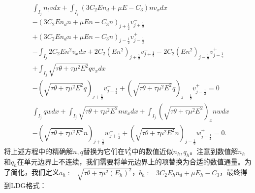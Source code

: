 \begin{align}
	 & \int_{I_{j}} n_{t} v d x+\int_{I_{j}}\left(3 C_{2} E n_{d}+\mu E-C_{3}\right) n v_{x} d x                                                                          \nonumber                                              \\
	 & -\left(3 C_{2} E n_{d} n+\mu E n-C_{3} n\right)_{j+\frac{1}{2}} v_{j+\frac{1}{2}}^{-}                                                                                       \nonumber                                     \\
	 & +\left(3 C_{2} E n_{d} n+\mu E n-C_{3} n\right)_{j-\frac{1}{2}} v_{j-\frac{1}{2}}^{+}                                                                                      \nonumber                                      \\
	 & -\int_{I_{j}} 2 C_{2} E n^{2} v_{x} d x+2 C_{2}\left(E n^{2}\right)_{j+\frac{1}{2}} v_{j+\frac{1}{2}}^{-}-2 C_{2}\left(E n^{2}\right)_{j-\frac{1}{2}} v_{j-\frac{1}{2}}^{+}           \nonumber                           \\
	 & +\int_{I_{j}} \sqrt{\tau \theta+\tau \mu^{2} E^{2}} q v_{x} d x                                                                                               \nonumber                                                   \\
	 & -\left(\sqrt{\tau \theta+\tau \mu^{2} E^{2}} q\right)_{j+\frac{1}{2}} v_{j+\frac{1}{2}}^{-}+\left(\sqrt{\tau \theta+\tau \mu^{2} E^{2}} q\right)_{j-\frac{1}{2}} v_{j-\frac{1}{2}}^{+}=0  \label{eq:HFRewrittenWeakForma} \\
	 & \int_{I_{j}} q w d x+\int_{I_{j}} \sqrt{\tau \theta+\tau \mu^{2} E^{2}} n w_{x} d x+\int_{I_{j}}\left(\sqrt{\tau \theta+\tau \mu^{2} E^{2}}\right)_{x} n w d x    \nonumber                                               \\
	 & -\left(\sqrt{\tau \theta+\tau \mu^{2} E^{2}} n\right)_{j+\frac{1}{2}} w_{j+\frac{1}{2}}^{-}+\left(\sqrt{\tau \theta+\tau \mu^{2} E^{2}} n\right)_{j-\frac{1}{2}} w_{j-\frac{1}{2}}^{+}=0 .\label{eq:HFRewrittenWeakFormb}
\end{align}
将上述方程中的精确解$n, q$替换为它们在$V_{h}^{k}$中的数值近似$n_h, q_h$。注意到数值解$n_h$和$q_h$在单元边界上不连续，我们需要将单元边界上的项替换为合适的数值通量。为了简化，我们定义$a_h:=\sqrt{\tau \theta+\tau \mu^{2}\left(E_h\right)^{2}}$，$b_h:=3 C_{2} E_h n_{d}+\mu E_h-C_{3}$，最终得到LDG格式：

